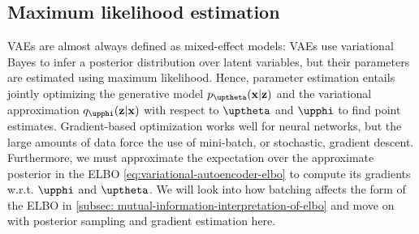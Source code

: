 

\subsection{Maximum likelihood estimation}
%
VAEs are almost always defined as mixed-effect models: VAEs use variational Bayes to infer a posterior distribution over latent variables, but their parameters are estimated using maximum likelihood. 
Hence, parameter estimation entails jointly optimizing the generative model $p_\thetab(\xb|\zb)$ and the variational approximation $q_\phib(\zb|\xb)$ with respect to $\thetab$ and $\phib$ to find point estimates. 
Gradient-based optimization works well for neural networks, but the large amounts of data force the use of mini-batch, or stochastic, gradient descent. 
Furthermore, we must approximate the expectation over the approximate posterior in the ELBO \cref{eq:variational-autoencoder-elbo} to compute its gradients w.r.t. $\phib$ and $\thetab$. 
We will look into how batching affects the form of the ELBO in \cref{subsec: mutual-information-interpretation-of-elbo} and move on with posterior sampling and gradient estimation here. 

